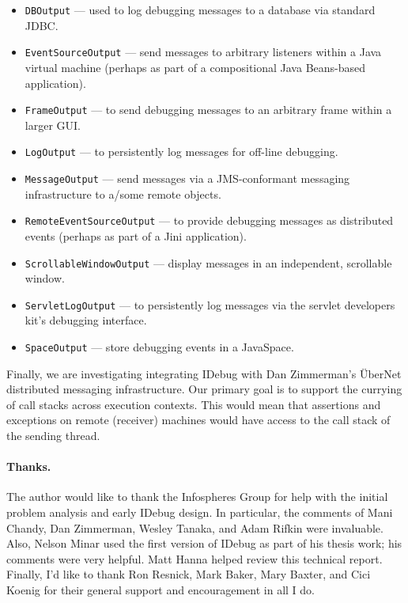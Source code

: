 \documentclass{article}
\begin{document}
\begin{itemize}
\item \texttt{DBOutput} --- used to log debugging messages to a
  database via standard JDBC.
\item \texttt{EventSourceOutput} --- send messages to arbitrary
  listeners within a Java virtual machine (perhaps as part of a
  compositional Java Beans-based application).
\item \texttt{FrameOutput} --- to send debugging messages to an
  arbitrary frame within a larger GUI.
\item \texttt{LogOutput} --- to persistently log messages for
  off-line debugging.
\item \texttt{MessageOutput} --- send messages via a
  JMS-conformant messaging infrastructure to a/some remote objects.
\item \texttt{RemoteEventSourceOutput} --- to provide debugging
  messages as distributed events (perhaps as part of a
  Jini\cite{JiniArchOverview98} application).
\item \texttt{ScrollableWindowOutput} --- display messages in an
  independent, scrollable window.
\item \texttt{ServletLogOutput} --- to persistently log messages via
  the servlet developers kit's debugging interface.
\item \texttt{SpaceOutput} --- store debugging events in a
  JavaSpace\cite{JavaSpaces98}.
\end{itemize}

Finally, we are investigating integrating IDebug with Dan Zimmerman's
\"UberNet distributed messaging infrastructure\cite{Zimmerman98}. Our
primary goal is to support the currying of call stacks across
execution contexts.  This would mean that assertions and exceptions on
remote (receiver) machines would have access to the call stack of the
sending thread.

\paragraph{Thanks.}
The author would like to thank the Infospheres Group for help with the
initial problem analysis and early IDebug design.  In particular, the
comments of Mani Chandy, Dan Zimmerman, Wesley Tanaka, and Adam Rifkin
were invaluable.  Also, Nelson Minar used the first version of IDebug
as part of his thesis work; his comments were very helpful.  Matt
Hanna helped review this technical report.  Finally, I'd like to thank
Ron Resnick, Mark Baker, Mary Baxter, and Cici Koenig for their
general support and encouragement in all I do.





\end{document}
